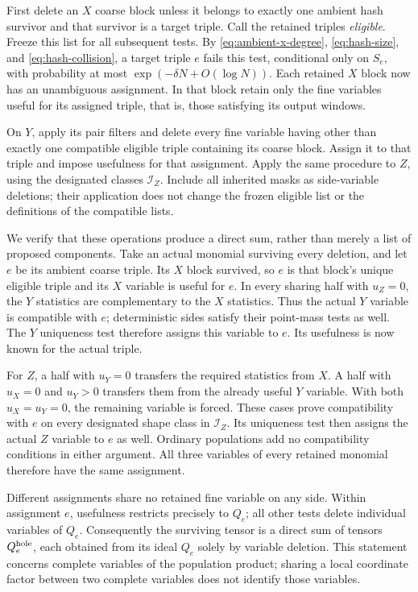 First delete an $X$ coarse block unless it belongs to exactly one
ambient hash survivor and that survivor is a target triple.  Call
the retained triples \emph{eligible}.  Freeze this list for all
subsequent tests.  By \eqref{eq:ambient-x-degree},
\eqref{eq:hash-size}, and \eqref{eq:hash-collision}, a target triple
$e$ fails this test, conditional only on $S_e$, with probability at
most $\exp(-\delta N+O(\log N))$.  Each retained $X$ block now has
an unambiguous assignment.  In that block retain only the fine
variables useful for its assigned triple, that is, those satisfying
its output windows.

On $Y$, apply its pair filters and delete every fine variable
having other than exactly one compatible eligible triple containing
its coarse block.  Assign it to that triple and impose usefulness
for that assignment.  Apply the same procedure to $Z$, using
the designated classes $\mathcal I_Z$.  Include all inherited masks
as side-variable deletions; their application does not change the frozen eligible
list or the definitions of the compatible lists.

We verify that these operations produce a direct sum, rather than
merely a list of proposed components.  Take an actual monomial
surviving every deletion, and let $e$ be its ambient coarse triple.
Its $X$ block survived, so $e$ is that block's unique eligible
triple and its $X$ variable is useful for $e$.  In every sharing
half with $u_Z=0$, the $Y$ statistics are complementary to the
$X$ statistics.  Thus the actual $Y$ variable is compatible with
$e$; deterministic sides satisfy their point-mass tests as well.
The $Y$ uniqueness test therefore assigns this variable to $e$.
Its usefulness is now known for the actual triple.

For $Z$, a half with $u_Y=0$ transfers the required statistics from
$X$.  A half with $u_X=0$ and $u_Y>0$ transfers them from the
already useful $Y$ variable.  With both $u_X=u_Y=0$, the remaining
variable is forced.  These cases prove compatibility with $e$ on
every designated shape class in $\mathcal I_Z$.  Its uniqueness test then
assigns the actual $Z$ variable to $e$ as well.  Ordinary
populations add no compatibility conditions in either argument.
All three variables of every retained monomial therefore have the
same assignment.

Different assignments share no retained fine variable on any side.
Within assignment $e$, usefulness restricts precisely to $Q_e$;
all other tests delete individual variables of $Q_e$.  Consequently
the surviving tensor is a direct sum of tensors $Q_e^{\rm hole}$,
each obtained from its ideal $Q_e$ solely by variable deletion.
This statement concerns complete variables of the population
product; sharing a local coordinate factor between two complete
variables does not identify those variables.

